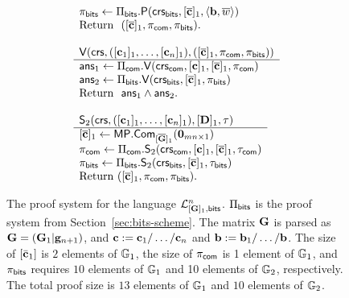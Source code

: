 \begin{figure}
\begin{\algSize}
$$\begin{array}{l}
\begin{array}{l}
\pi_{\mathsf{bits}} \gets \Pi_{\mathsf{bits}}.\mathsf{P}(\mathsf{crs}_{\mathsf{bits}},[\overline{\mathbf{c}}]_1,\langle \mathbf{b},\overline{w}\rangle)\\
\text{Return } \  ([\overline{\mathbf{c}}]_1,\pi_{\mathsf{com}},\pi_{\mathsf{bits}}). \\
\\
\end{array}\\
\begin{array}{l}
{\mathsf{V}(\mathsf{crs},([\mathbf{c}_1]_1,\ldots,[\mathbf{c}_n]_1),([\overline{\mathbf{c}}]_1,\pi_{\mathsf{com}},\pi_{\mathsf{bits}}))}\\
\hline
\mathsf{ans}_1 \gets \Pi_{\mathsf{com}}.\mathsf{V}(\mathsf{crs}_{\mathsf{com}},[\mathbf{c}]_1,[\overline{\mathbf{c}}]_1,\pi_{\mathsf{com}})\\
\mathsf{ans}_2 \gets \Pi_{\mathsf{bits}}.\mathsf{V}(\mathsf{crs}_{\mathsf{bits}},[\overline{\mathbf{c}}]_1,\pi_{\mathsf{bits}})\\
\text{Return } \ \mathsf{ans}_1\wedge\mathsf{ans}_2.
\\
\\
\end{array}
\\
\begin{array}{l}
{\mathsf{S}_2(\mathsf{crs},([\mathbf{c}_1]_1,\ldots,[\mathbf{c}_n]_1),[\mathbf{{D}}]_1,\tau)}\\
\hline
{[\overline{\mathbf{c}}]_1 \gets \mathsf{MP}.\mathsf{Com}_{[\overline{\mathbf{{G}}}]_1}(\mathbf{0}_{mn\times 1})}\\
\pi_{\mathsf{com}}\gets \Pi_{\mathsf{com}}.\mathsf{S}_2(\mathsf{crs}_{\mathsf{com}},[\mathbf{c}]_1,[\overline{\mathbf{c}}]_1,\tau_{\mathsf{com}})\\
\pi_{\mathsf{bits}} \gets \Pi_{\mathsf{bits}}.\mathsf{S}_2(\mathsf{crs}_{\mathsf{bits}},[\overline{\mathbf{c}}]_1,\tau_{\mathsf{bits}})\\
\text{Return }  ([\overline{\mathbf{c}}]_1,\pi_{\mathsf{com}}, \pi_{\mathsf{bits}}).
\end{array}
\end{array}$$
\end{\algSize}
\caption{The proof system for the language $\mathcal{L}_{[\mathbf{{G}}]_1,\mathsf{bits}}^n$. $\Pi_{\mathsf{bits}}$ is the proof system from Section~\ref{sec:bits-scheme}. The matrix $\mathbf{{G}}$ is parsed as $\mathbf{G}=(\mathbf{G}_1|\mathbf{g}_{n+1})$, and $\mathbf{c}:=\mathbf{c}_1/\ldots/\mathbf{c}_n$ and $\mathbf{b}:=\mathbf{b}_1/\ldots/\mathbf{b}$. The size of $[\bar{\mathbf{c}}_1]$ is $2$ elements of $\mathbb{G}_1$, the size of $\pi_{\mathsf{com}}$ is 1 element of $\mathbb{G}_1$, and $\pi_{\mathsf{bits}}$ requires $10$ elements of $\mathbb{G}_1$ and 10 elements of $\mathbb{G}_2$, respectively. The total proof size is $13$ elements of $\mathbb{G}_1$ and $10$ elements of $\mathbb{G}_2$.
\label{fig:bitsn}
}
\end{figure}
